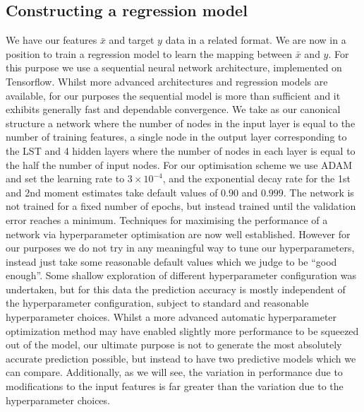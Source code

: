 \documentclass[twocolumn]{article}
\begin{document}
\subsection{Constructing a regression model}
We have our features $\bar{x}$ and target $y$ data in a related format. We are now in a position to train a regression model to learn the mapping between $\bar{x}$ and $y$. For this purpose we use a sequential neural network architecture, implemented on Tensorflow\cite{tensorflow2015-whitepaper}. Whilst more advanced architectures and regression models are available, for our purposes the sequential model is more than sufficient and it exhibits generally fast and dependable convergence. We take as our canonical structure a network where the number of nodes in the input layer is equal to the number of training features, a single node in the output layer corresponding to the LST and 4 hidden layers where the number of nodes in each layer is equal to the half the number of input nodes.  For our optimisation scheme we use ADAM\cite{2014adam} and set the learning rate to $3 \times 10^{-4}$, and the exponential decay rate for the 1st and 2nd moment estimates take default values of $0.90$ and $0.999$. The network is not trained for a fixed number of epochs, but instead trained until the validation error reaches a minimum. Techniques for maximising the performance of a network via hyperparameter optimisation are now well established\cite{HPO1,HPO2}. However for our purposes we do not try in any meaningful way to tune our hyperparameters, instead just take some reasonable default values which we judge to be ``good enough''. Some shallow exploration of different hyperparameter configuration was undertaken, but for this data the prediction accuracy is mostly independent of the hyperparameter configuration, subject to standard and reasonable hyperparameter choices. Whilst a more advanced automatic hyperparameter optimization method may have enabled slightly more performance to be squeezed out of the model, our ultimate purpose is not to generate the most absolutely accurate prediction possible, but instead to have two predictive models which we can compare. Additionally, as we will see, the variation in performance due to modifications to the input features is far greater than the variation due to the hyperparameter choices. \newline 
\end{document}
